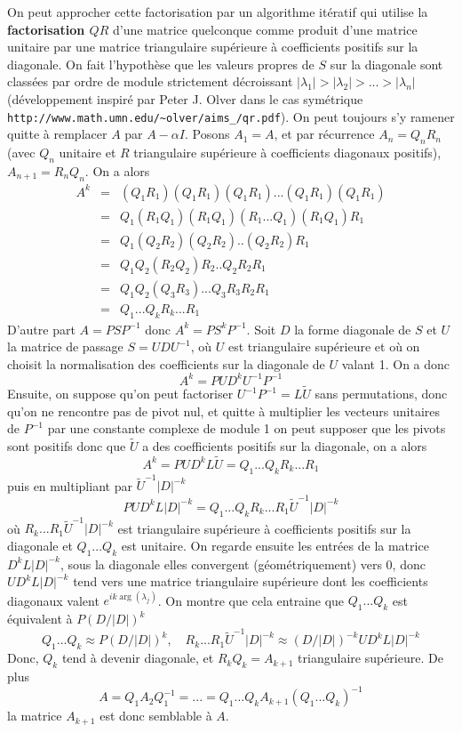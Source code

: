 \documentclass[a4paper,11pt]{book}
\begin{document}
\begin{giacjshere}
On peut approcher cette factorisation par un algorithme it\'eratif
qui utilise la {\bf factorisation $QR$} 
d'une matrice quelconque comme
produit d'une matrice unitaire par une matrice triangulaire sup\'erieure
\`a coefficients positifs sur la diagonale. On fait l'hypoth\`ese que les
valeurs propres de $S$ sur la diagonale sont class\'ees par ordre de module 
strictement d\'ecroissant $|\lambda_1|>|\lambda_2|>...>|\lambda_n|$ 
(d\'eveloppement inspir\'e par Peter J. Olver dans le cas sym\'etrique
\verb|http://www.math.umn.edu/~olver/aims_/qr.pdf|). On peut toujours
s'y ramener quitte à remplacer $A$ par $A- \alpha I$.
Posons $A_1=A$, et par r\'ecurrence $A_n=Q_nR_n$ (avec $Q_n$ unitaire et $R$
triangulaire sup\'erieure à coefficients diagonaux positifs), 
$A_{n+1}=R_nQ_n$. On a alors
\begin{eqnarray*}
 A^k  
& = & (Q_1 R_1) (Q_1 R_1) (Q_1 R_1) ... (Q_1 R_1) (Q_1 R_1) \\
& = & Q_1 (R_1 Q_1) (R_1 Q_1) (R_1 ... Q_1) (R_1 Q_1) R_1 \\
& = & Q_1 (Q_2 R_2) (Q_2 R_2) .. (Q_2 R_2) R_1 \\
& = & Q_1 Q_2 (R_2 Q_2) R_2 .. Q_2 R_2 R_1 \\
& = & Q_1 Q_2 (Q_3 R_3) ... Q_3 R_3 R_2 R_1 \\
& = & Q_1 ... Q_k R_k ...R_1
\end{eqnarray*}
D'autre part $A=PSP^{-1}$ donc $A^k = P S^k P^{-1}$. Soit $D$ la forme diagonale
de $S$ et $U$ la matrice de passage $S=UDU^{-1}$, où $U$ est triangulaire supérieure
et où on choisit la normalisation des coefficients sur la diagonale de $U$ valant 1.
On a donc 
\[ A^k = P U D^{k} U^{-1} P^{-1} \]
Ensuite, on suppose
qu'on peut factoriser $U^{-1}P^{-1}=L\tilde{U}$ sans permutations, donc
qu'on ne rencontre pas de pivot nul, et quitte \`a multiplier 
les vecteurs unitaires de $P^{-1}$ par une constante complexe de module 1
on peut supposer que les pivots sont positifs donc que $\tilde{U}$ a
des coefficients positifs sur la diagonale, on a alors
\[ A^k = P U D^k L \tilde{U} = Q_1 ... Q_k R_k ...R_1 \]
puis en multipliant par $\tilde{U}^{-1} |D|^{-k}$
\[ P U D^k L |D|^{-k} =  Q_1 ... Q_k R_k ...R_1 \tilde{U}^{-1} |D|^{-k} \]
o\`u $R_k ...R_1 \tilde{U}^{-1} |D|^{-k}$ est triangulaire sup\'erieure à coefficients positifs
sur la diagonale et $Q_1 ... Q_k$ est unitaire. On regarde ensuite les entr\'ees 
de la matrice $D^k L |D|^{-k}$, sous la diagonale elles convergent (géométriquement) vers 0,
donc $UD^k L |D|^{-k}$ tend vers une matrice triangulaire sup\'erieure
dont les coefficients diagonaux valent $e^{i k\arg(\lambda_j)}$. On montre que cela
entraine que $Q_1 ... Q_k $ est équivalent à $P(D/|D|)^k$
\[ Q_1 ... Q_k \approx P (D/|D|)^{k}, \quad  
R_k ...R_1 \tilde{U}^{-1} |D|^{-k} \approx (D/|D|)^{-k} UD^k L |D|^{-k} \]
Donc, $Q_k$ tend à devenir diagonale, et $R_k Q_k=A_{k+1}$ triangulaire supérieure. De plus
\[ A=Q_1 A_2 Q_1^{-1} = ... = Q_1 ... Q_k A_{k+1} (Q_1 ... Q_k)^{-1} \]
la matrice $A_{k+1}$ est donc semblable à $A$.


\end{giacjshere}
\end{document}

